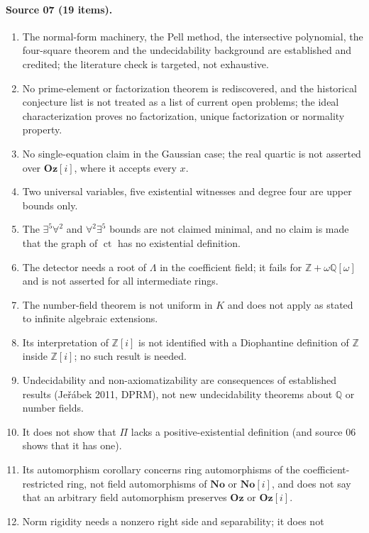 \documentclass[11pt,oneside]{article}
\numberwithin{equation}{section}
\theoremstyle{definition}
\theoremstyle{remark}
\newcommand{\No}{\mathbf{No}}
\newcommand{\Oz}{\mathbf{Oz}}
\newcommand{\Z}{\mathbb Z}
\newcommand{\Q}{\mathbb Q}
\newcommand{\ct}{\operatorname{ct}}
\newcommand{\Og}{\Oz[i]}
\begin{document}
\paragraph{Source 07 (19 items).}
\begin{enumerate}[leftmargin=*,itemsep=1pt]
\item The normal-form machinery, the Pell method, the intersective polynomial,
the four-square theorem and the undecidability background are established and
credited; the literature check is targeted, not exhaustive.
\item No prime-element or factorization theorem is rediscovered, and the
historical conjecture list is not treated as a list of current open
problems; the ideal characterization proves no factorization, unique
factorization or normality property.
\item No single-equation claim in the Gaussian case; the real quartic is not
asserted over $\Og$, where it accepts every $x$.
\item Two universal variables, five existential witnesses and degree four are
upper bounds only.
\item The $\exists^5\forall^2$ and $\forall^2\exists^5$ bounds are not claimed
minimal, and no claim is made that the graph of $\ct$ has no existential
definition.
\item The detector needs a root of $\Lambda$ in the coefficient field; it fails
for $\Z+\omega\Q[\omega]$ and is not asserted for all intermediate rings.
\item The number-field theorem is not uniform in $K$ and does not apply as
stated to infinite algebraic extensions.
\item Its interpretation of $\Z[i]$ is not identified with a Diophantine
definition of $\Z$ inside $\Z[i]$; no such result is needed.
\item Undecidability and non-axiomatizability are consequences of established
results (Je\v r\'abek 2011, DPRM), not new undecidability theorems about $\Q$ or
number fields.
\item It does not show that $\Pi$ lacks a positive-existential definition (and
source 06 shows that it has one).
\item Its automorphism corollary concerns ring automorphisms of the
coefficient-restricted ring, not field automorphisms of $\No$ or $\No[i]$, and
does not say that an arbitrary field automorphism preserves $\Oz$ or $\Og$.
\item Norm rigidity needs a nonzero right side and separability; it does not

\end{enumerate}
\end{document}

